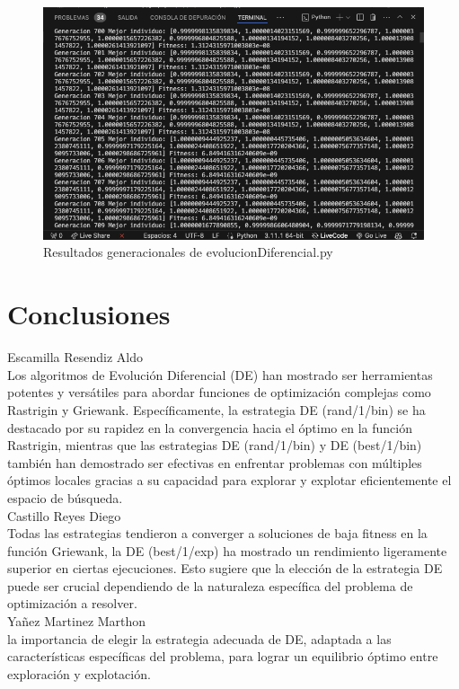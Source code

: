 \documentclass{report}
\begin{document}
\begin{figure}[H]
    \centering
    \includegraphics[width=1\textwidth]{generacionDif.png}
    \caption{Resultados generacionales de evolucionDiferencial.py}
\end{figure}

\section{Conclusiones}

Escamilla Resendiz Aldo\\
Los algoritmos de Evolución Diferencial (DE) han mostrado ser herramientas potentes y versátiles para abordar funciones de optimización complejas como Rastrigin y Griewank. Específicamente, la estrategia DE (rand/1/bin) se ha destacado por su rapidez en la convergencia hacia el óptimo en la función Rastrigin, mientras que las estrategias DE (rand/1/bin) y DE (best/1/bin) también han demostrado ser efectivas en enfrentar problemas con múltiples óptimos locales gracias a su capacidad para explorar y explotar eficientemente el espacio de búsqueda.\\
Castillo Reyes Diego\\
Todas las estrategias tendieron a converger a soluciones de baja fitness en la función Griewank, la DE (best/1/exp) ha mostrado un rendimiento ligeramente superior en ciertas ejecuciones. Esto sugiere que la elección de la estrategia DE puede ser crucial dependiendo de la naturaleza específica del problema de optimización a resolver.\\
Yañez Martinez Marthon\\
la importancia de elegir la estrategia adecuada de DE, adaptada a las características específicas del problema, para lograr un equilibrio óptimo entre exploración y explotación.
\end{document}

